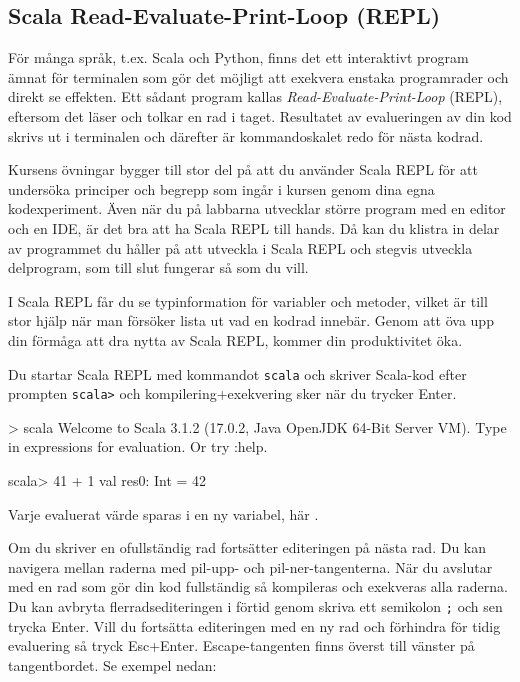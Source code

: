 \subsection{Scala Read-Evaluate-Print-Loop (REPL)}\label{appendix:compile:REPL}

För många språk, t.ex. Scala och Python, finns det ett interaktivt program ämnat för terminalen som gör det möjligt att exekvera enstaka programrader och direkt se effekten. Ett sådant program kallas \textit{Read-Evaluate-Print-Loop} (REPL), eftersom det läser  och tolkar en rad i taget. Resultatet av evalueringen av din kod skrivs ut i terminalen och därefter är kommandoskalet redo för nästa kodrad.

Kursens övningar bygger till stor del på att du använder Scala REPL för att undersöka principer och begrepp som ingår i kursen genom dina egna kodexperiment. Även när du på labbarna utvecklar större program med en editor och en IDE, är det bra att ha Scala REPL till hands. Då kan du klistra in delar av programmet du håller på att utveckla i Scala REPL och stegvis utveckla delprogram, som till slut fungerar så som du vill.

I Scala REPL får du se typinformation för variabler och metoder, vilket är till stor hjälp när man försöker lista ut vad en kodrad innebär. Genom att öva upp din förmåga att dra nytta av Scala REPL, kommer din produktivitet öka.

Du startar Scala REPL med kommandot \texttt{scala} och skriver Scala-kod efter prompten \texttt{scala>} och kompilering+exekvering sker när du trycker Enter.
\begin{REPLnonum}
> scala
Welcome to Scala 3.1.2 (17.0.2, Java OpenJDK 64-Bit Server VM).
Type in expressions for evaluation. Or try :help.
                                                                                                                               
scala> 41 + 1
val res0: Int = 42
\end{REPLnonum}

Varje evaluerat värde sparas i en ny variabel, här .

Om du skriver en ofullständig rad fortsätter editeringen på nästa rad. Du kan navigera mellan raderna med pil-upp- och pil-ner-tangenterna. När du avslutar med en rad som gör din kod fullständig så kompileras och exekveras alla raderna. Du kan avbryta flerradsediteringen i förtid genom skriva ett semikolon \texttt{;} och sen trycka Enter. Vill du fortsätta editeringen med en ny rad och förhindra för tidig evaluering så tryck Esc+Enter. Escape-tangenten finns överst till vänster på tangentbordet. Se exempel nedan:

